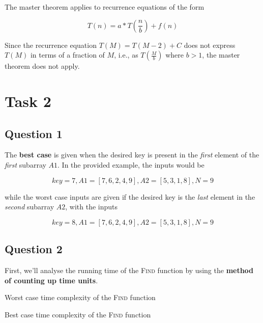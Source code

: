 The master theorem applies to recurrence equations of the form

\[
    T(n) = a*T(\frac{n}{b}) + f(n)
\]

Since the recurrence equation $T(M) = T(M-2) + C$ does not express $T(M)$ in terms of a fraction of $M$, i.e., as $T(\frac{M}{b})$ where $b > 1$, the master theorem does not apply.

\section{Task 2}
\subsection{Question 1}

The \textbf{best case} is given when the desired key is present in the \textit{first} element of the \textit{first} subarray $A1$. In the provided example, the inputs would be

\[
    key = 7, A1 = [7,6,2,4,9], A2 = [5, 3 ,1, 8], N = 9
\]

while the worst case inputs are given if the desired key is the \textit{last} element in the \textit{second} subarray $A2$, with the inputs

\[
    key = 8, A1 = [7,6,2,4,9], A2 = [5, 3 ,1, 8], N = 9
\]

\subsection{Question 2}
First, we'll analyse the running time of the \textsc{Find} function by using the \textbf{method of counting up time units}.

\begin{algorithm}[H]
    \caption{Worst case time complexity of the \textsc{Find} function }\label{alg:FindTime}
    \begin{algorithmic}

         \hfill{}
         \hfill{}
         \hfill{}
        \EndIf{}
        \EndFor{}
         \hfill{}
        \EndFunction{}
    \end{algorithmic}
\end{algorithm}

\begin{algorithm}[H]
    \caption{Best case time complexity of the \textsc{Find} function }\label{alg:FindTimeBest}
    \begin{algorithmic}

         \hfill{}
         \hfill{}
         \hfill{}
        \EndIf{}
        \EndFor{}
         \hfill{}
        \EndFunction{}
    \end{algorithmic}
\end{algorithm}


